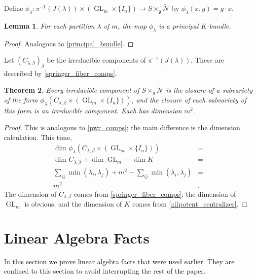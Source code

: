 \documentclass[12pt,psamsfonts]{article}
\DeclareMathOperator{\GL}{GL}
\newtheorem{theorem}{Theorem}[section]
\newtheorem{lemma}[theorem]{Lemma}
\begin{document}
Define \(\phi_\lambda : \pi^{-1}(J(\lambda)) \times (\GL_m \times \{I_n\}) \to S \times_\mathfrak{g} \widetilde{\mathcal{N}}\) by \(\phi_\lambda(x, g) = g \cdot x\).

\begin{lemma}\label{principal_bundle_two}
    For each partition \(\lambda\) of \(m\), the map \(\phi_\lambda\) is a principal \(K\)-bundle.
\end{lemma}
\begin{proof}
    Analogous to \cref{principal_bundle}.
\end{proof}

Let \((C_{\lambda, \beta})_\beta\) be the irreducible components of \(\pi^{-1}(J(\lambda))\).
These are described by \cref{springer_fiber_comps}.

\begin{theorem}
    Every irreducible component of \(S \times_\mathfrak{g} \widetilde{\mathcal{N}}\) is the closure of a subvariety of the form \(\phi_\lambda(C_{\lambda,\beta} \times (\GL_m \times \{I_n\}))\), and the closure of each subvariety of this form is an irreducible component.
    Each has dimension \(m^2\).
\end{theorem}
\begin{proof}
    This is analogous to \cref{pwr_comps}; the main difference is the dimension calculation.
    This time, 
    \begin{align*}
        \dim \phi_\lambda(C_{\lambda, \beta} \times (\GL_m \times \{I_n\})) & = \\
        \dim C_{\lambda,\beta} + \dim \GL_m - \dim K & = \\
        \sum_{ij} \min(\lambda_i, \lambda_j) + m^2 - \sum_{ij} \min(\lambda_i, \lambda_j) & = \\
        m^2 & .
    \end{align*}
    The dimension of \(C_{\lambda, \beta}\) comes from \cref{springer_fiber_comps}; the dimension of \(\GL_m\) is obvious; and the dimension of \(K\) comes from \cref{nilpotent_centralizer}.
\end{proof}

\section{Linear Algebra Facts}\label{linalg}
In this section we prove linear algebra facts that were used earlier.
They are confined to this section to avoid interrupting the rest of the paper.
\end{document}
